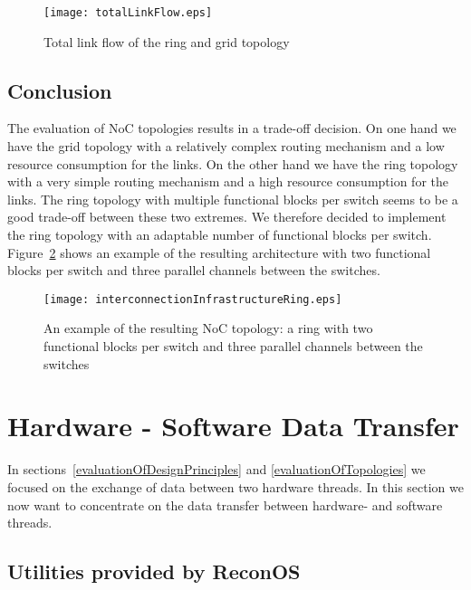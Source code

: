 \begin{figure}
  \begin{center}
		 \texttt{[image: totalLinkFlow.eps]}
  \caption{Total link flow of the ring and grid topology}
  \label{totalLinkFlow.eps}
  \end{center}
\end{figure}

\subsection{\label{evaluationOfTopologies:conclusion}Conclusion}
The evaluation of NoC topologies results in a trade-off decision. On one hand we have the grid topology with a relatively complex routing mechanism and a low resource consumption for the links. On the other hand we have the ring topology with a very simple routing mechanism and a high resource consumption for the links. The ring topology with multiple functional blocks per switch seems to be a good trade-off between these two extremes. We therefore decided to implement the ring topology with an adaptable number of functional blocks per switch. Figure~\ref{interconnectionInfrastructureRing.eps} shows an example of the resulting architecture with two functional blocks per switch and three parallel channels between the switches.
\begin{figure}
  \begin{center}
		 \texttt{[image: interconnectionInfrastructureRing.eps]}
  \caption{An example of the resulting NoC topology: a ring with two functional blocks per switch and three parallel channels between the switches}
  \label{interconnectionInfrastructureRing.eps}
  \end{center}
\end{figure}


\section{\label{hwSwDataTransfer}Hardware - Software Data Transfer}
In sections~\ref{evaluationOfDesignPrinciples} and \ref{evaluationOfTopologies} we focused on the exchange of data between two hardware threads. In this section we now want to concentrate on the data transfer between hardware- and software threads. 

\subsection{Utilities provided by ReconOS}
